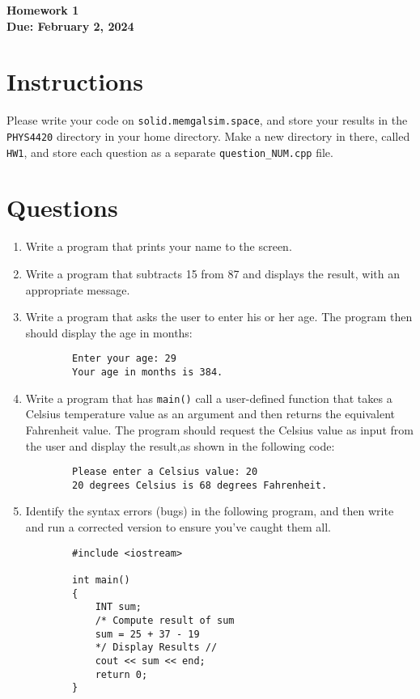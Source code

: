 \documentclass[11pt]{article}
\begin{document}
\begin{center}
\textbf{\Large Homework 1}\\
\textbf{Due: February 2, 2024}\\
\end{center}
\section*{Instructions}
Please write your code on \texttt{solid.memgalsim.space}, and store your results
in the \texttt{PHYS4420} directory in your home directory.  Make a new directory in there, called \texttt{HW1}, and 
store each question as a separate \texttt{question\_NUM.cpp} file.
\section*{Questions}
\begin{enumerate}
    \item Write a program that prints your name to the screen.
    \item Write a program that subtracts 15 from 87 and displays the result, with an appropriate message.
    \item Write a program that asks the user to enter his or her age. The program then should
    display the age in months:
    \begin{verbatim}
        Enter your age: 29
        Your age in months is 384.
    \end{verbatim}
    \item Write a program that has \texttt{main()} call a user-defined function that takes a Celsius
    temperature value as an argument and then returns the equivalent Fahrenheit value.
    The program should request the Celsius value as input from the user and display
    the result,as shown in the following code: \\
    \begin{verbatim}
        Please enter a Celsius value: 20
        20 degrees Celsius is 68 degrees Fahrenheit.
    \end{verbatim}
    \item Identify the syntax errors (bugs) in the following program, and then
    write and run a corrected version to ensure you've caught them all.
    \begin{verbatim}
        #include <iostream>

        int main() 
        {
            INT sum;
            /* Compute result of sum
            sum = 25 + 37 - 19
            */ Display Results //
            cout << sum << end;
            return 0;
        }
    \end{verbatim}
\end{enumerate}
\end{document}
